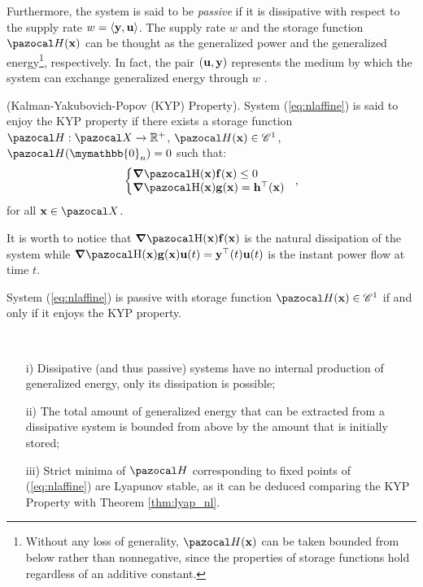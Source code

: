 Furthermore, the system is said to be \textit{passive} if it is dissipative with respect to the supply rate $w = \langle \mathbf{y},\mathbf{u} \rangle$. The supply rate $w$ and the storage function $\Ha(\xb)$ can be thought as the generalized power and the generalized energy\footnote{Without any loss of generality, $\Ha(\xb)$ can be taken bounded from below rather than nonnegative, since the properties of storage functions hold regardless of an additive constant.}, respectively. In fact, the pair $(\mathbf{u},\mathbf{y})$ represents the medium by which the system can exchange generalized energy through $w$ \citep{secchi2007control}.
%
\begin{defn}(Kalman-Yakubovich-Popov (KYP) Property).
    System (\ref{eq:nlaffine}) is said to enjoy the KYP property if there exists a storage function $\Ha:\X\rightarrow\R^+$, $\Ha(\xb)\in\mathcal{C}^1$, $\Ha(\mymathbb{0}_n) = 0$ such that:
    \begin{equation}
        \left\{
        \begin{matrix*}[l]
            {\dH(\xb)}\fb(\xb)\leq 0\quad\\ 
            {\dH(\xb)}\gb(\xb)= \hb^\top(\xb)
        \end{matrix*}
        \right.~~,
    \end{equation}
    for all $\xb\in\X$.
\end{defn}
%
It is worth to notice that ${\dH(\xb)}\fb(\xb)$ is the natural dissipation of the system while ${\dH(\xb)}\gb(\xb)\ub(t)=\yb^\top(t)\ub(t)$ is the instant power flow at time $t$.
%
\begin{prop}
    System (\ref{eq:nlaffine}) is passive with storage function $\Ha(\xb)\in \mathcal{C}^1$ if and only if it enjoys the KYP property.
\end{prop}
%
\begin{rem}\textcolor{white}{a}
\begin{itemize}
    \item[i)] Dissipative (and thus passive) systems have no internal production of generalized energy, only its dissipation is possible; 
    \item[ii)] The total amount of generalized energy that can be extracted from a dissipative system is bounded from above by the amount that is initially stored; 
    \item[iii)] Strict minima of $\Ha$ corresponding to fixed points of (\ref{eq:nlaffine}) are Lyapunov stable, as it can be deduced comparing the KYP Property with Theorem \ref{thm:lyap_nl}.
\end{itemize}
\end{rem}
%
